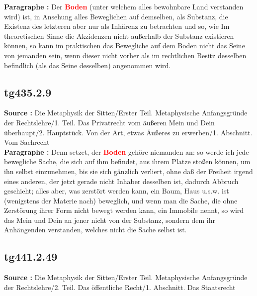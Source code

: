\documentclass[a4paper,12pt,twoside]{book}
\newcommand{\match}[1]{\textcolor{red}{\textbf{#1}}}
\begin{document}
	\textbf{Paragraphe : }Der \match{Boden} (unter welchem alles bewohnbare Land verstanden wird) ist, in Ansehung alles Beweglichen auf demselben, als Substanz, die Existenz des letzteren aber nur als Inhärenz zu betrachten und so, wie Im theoretischen Sinne die Akzidenzen nicht außerhalb der Substanz existieren können, so kann im praktischen das Bewegliche auf dem Boden nicht das Seine von jemanden sein, wenn dieser nicht vorher als im rechtlichen Besitz desselben befindlich (als das Seine desselben) angenommen wird. 
	
	\subsection*{tg435.2.9} 
	\textbf{Source : }Die Metaphysik der Sitten/Erster Teil. Metaphysische Anfangsgründe der Rechtslehre/1. Teil. Das Privatrecht vom äußeren Mein und Dein überhaupt/2. Hauptstück. Von der Art, etwas Äußeres zu erwerben/1. Abschnitt. Vom Sachrecht\\  
	
	\textbf{Paragraphe : }Denn setzet, der \match{Boden} gehöre niemanden an: so werde ich jede bewegliche Sache, die sich auf ihm befindet, aus ihrem Platze stoßen können, um ihn selbst einzunehmen, bis sie sich gänzlich verliert, ohne daß der Freiheit irgend eines anderen, der jetzt gerade nicht Inhaber desselben ist, dadurch Abbruch geschieht; alles aber, was zerstört werden kann, ein Baum, Haus u.s.w. ist (wenigstens der Materie nach) beweglich, und wenn man die Sache, die ohne Zerstörung ihrer Form nicht bewegt werden kann, ein Immobile nennt, so wird das Mein und Dein an jener nicht von der Substanz, sondern dem ihr Anhängenden verstanden, welches nicht die Sache selbst ist. 
	
	\subsection*{tg441.2.49} 
	\textbf{Source : }Die Metaphysik der Sitten/Erster Teil. Metaphysische Anfangsgründe der Rechtslehre/2. Teil. Das öffentliche Recht/1. Abschnitt. Das Staatsrecht\\  
	
\end{document}
